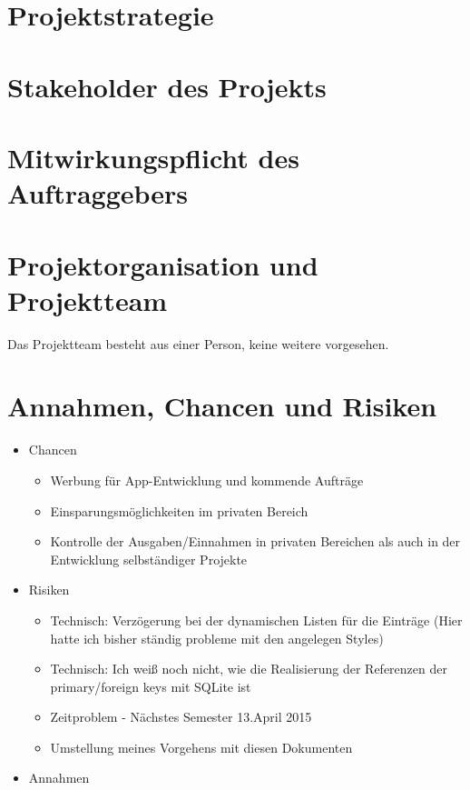 \section{Projektstrategie}

\section{Stakeholder des Projekts}

\section{Mitwirkungspflicht des Auftraggebers}

\section{Projektorganisation und Projektteam}
Das Projektteam besteht aus einer Person, keine weitere vorgesehen. 

\section{Annahmen, Chancen und Risiken}
\begin{itemize}
	\item Chancen
	\begin{itemize}
		\item Werbung für App-Entwicklung und kommende Aufträge
		\item Einsparungsmöglichkeiten im privaten Bereich
		\item Kontrolle der Ausgaben/Einnahmen in privaten Bereichen als auch in der Entwicklung selbständiger Projekte
	\end{itemize}
	\item Risiken
	\begin{itemize}
		\item Technisch: Verzögerung bei der dynamischen Listen für die Einträge (Hier hatte ich bisher ständig probleme mit den angelegen Styles)
		\item Technisch: Ich weiß noch nicht, wie die Realisierung der Referenzen der primary/foreign keys mit SQLite ist
		\item Zeitproblem - Nächstes Semester 13.April 2015
		\item Umstellung meines Vorgehens mit diesen Dokumenten
	\end{itemize}
	\item Annahmen
\end{itemize}